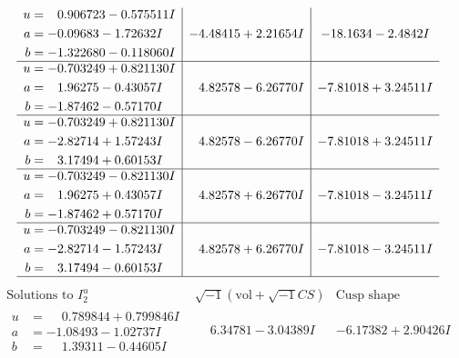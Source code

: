 \documentclass[1p]{elsarticle_modified}
\theoremstyle{definition}
\newcommand{\I}{\sqrt{-1}}
\begin{document}
$$\begin{array}{c|c|c}
\begin{aligned}
u &= \phantom{-}0.906723 - 0.575511 I \\
a &= -0.09683 - 1.72632 I \\
b &= -1.322680 - 0.118060 I\end{aligned}
 & -4.48415 + 2.21654 I & -18.1634 - 2.4842 I \\ \hline\begin{aligned}
u &= -0.703249 + 0.821130 I \\
a &= \phantom{-}1.96275 - 0.43057 I \\
b &= -1.87462 - 0.57170 I\end{aligned}
 & \phantom{-}4.82578 - 6.26770 I & -7.81018 + 3.24511 I \\ \hline\begin{aligned}
u &= -0.703249 + 0.821130 I \\
a &= -2.82714 + 1.57243 I \\
b &= \phantom{-}3.17494 + 0.60153 I\end{aligned}
 & \phantom{-}4.82578 - 6.26770 I & -7.81018 + 3.24511 I \\ \hline\begin{aligned}
u &= -0.703249 - 0.821130 I \\
a &= \phantom{-}1.96275 + 0.43057 I \\
b &= -1.87462 + 0.57170 I\end{aligned}
 & \phantom{-}4.82578 + 6.26770 I & -7.81018 - 3.24511 I \\ \hline\begin{aligned}
u &= -0.703249 - 0.821130 I \\
a &= -2.82714 - 1.57243 I \\
b &= \phantom{-}3.17494 - 0.60153 I\end{aligned}
 & \phantom{-}4.82578 + 6.26770 I & -7.81018 - 3.24511 I\\
 \hline 
 \end{array}$$\newpage$$\begin{array}{c|c|c}  
\text{Solutions to }I^u_{2}& \I (\text{vol} + \sqrt{-1}CS) & \text{Cusp shape}\\
 \hline 
\begin{aligned}
u &= \phantom{-}0.789844 + 0.799846 I \\
a &= -1.08493 - 1.02737 I \\
b &= \phantom{-}1.39311 - 0.44605 I\end{aligned}
 & \phantom{-}6.34781 - 3.04389 I & -6.17382 + 2.90426 I \\ \hline\begin{aligned}

\end{aligned}
\end{array}$$
\end{document}
